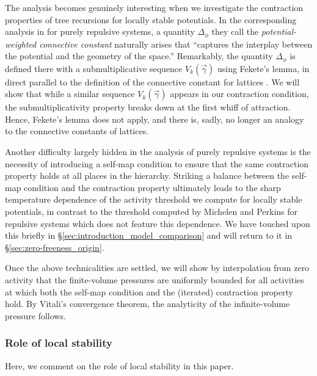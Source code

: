 \documentclass[11pt]{article}
\newcommand{\pwcc}{\Delta_{\phi}}
\numberwithin{equation}{section}
\theoremstyle{plain}
\theoremstyle{definition}
\theoremstyle{remark}
\begin{document}
The analysis becomes genuinely interesting when we investigate the contraction properties of tree recursions for locally stable potentials.
In the corresponding analysis in \cite{michelen2023analyticity} for purely repulsive systems, a quantity $\pwcc$ they call the \emph{potential-weighted connective constant} naturally arises that ``captures the interplay between the potential and the geometry of the space.''
Remarkably, the quantity $\pwcc$ is defined there with a submultiplicative sequence $V_{k}(\vec{\gamma})$ \cite[Lemma 9]{michelen2023analyticity} using Fekete's lemma, in direct parallel to the definition of the connective constant for lattices \cite{duminil2012connective}.
We will show that while a similar sequence $V_{k}(\vec{\gamma})$ appears in our contraction condition, the submultiplicativity property breaks down at the first whiff of attraction.
Hence, Fekete's lemma does not apply, and there is, sadly, no longer an analogy to the connective constants of lattices.

Another difficulty largely hidden in the analysis of purely repulsive systems is the necessity of introducing a self-map condition to ensure that the same contraction property holds at all places in the hierarchy.
Striking a balance between the self-map condition and the contraction property ultimately leads to the sharp temperature dependence of the activity threshold we compute for locally stable potentials, in contrast to the threshold computed by Michelen and Perkins for repulsive systems which does not feature this dependence.
We have touched upon this briefly in \S\ref{sec:introduction_model_comparison} and will return to it in \S\ref{sec:zero-freeness_origin}.

Once the above technicalities are settled, we will show by interpolation from zero activity that the finite-volume pressures are uniformly bounded for all activities at which both the self-map condition and the (iterated) contraction property hold.
By Vitali's convergence theorem, the analyticity of the infinite-volume pressure follows.



\subsubsection{Role of local stability}
\label{sec:introduction_model_local-stability}

Here, we comment on the role of local stability in this paper.
\end{document}
